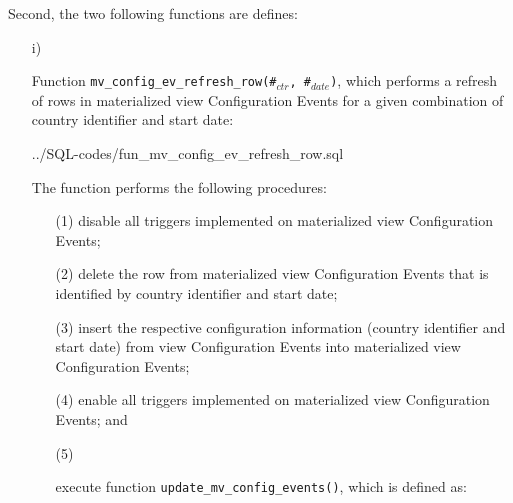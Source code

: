 Second, the two following functions are defines:
\begin{itemize}
\item[i)]{%
Function \texttt{\footnotesize mv\_config\_ev\_refresh\_row(\#$_{ctr}$, \#$_{date}$)}\label{fun_mv_config_ev_refresh}, which performs a refresh of rows in materialized view Configuration Events for a given combination of country identifier and start date:

%
{../SQL-codes/fun_mv_config_ev_refresh_row.sql}
% 
% 
% 
%   

The function performs the following procedures:
\begin{itemize}
\item[(1)]{disable all triggers implemented on materialized view Configuration Events;}
\item[(2)]{delete the row from materialized view Configuration Events that is identified by country identifier and start date;}
\item[(3)]{insert the respective configuration information (country identifier and start date) from view  Configuration Events into materialized view Configuration Events;}
\item[(4)]{enable all triggers implemented on materialized view Configuration Events; and}
\item[(5)]{execute function \texttt{\footnotesize update\_mv\_config\_events()}, which is defined as:

}
\end{itemize}}
\end{itemize}
